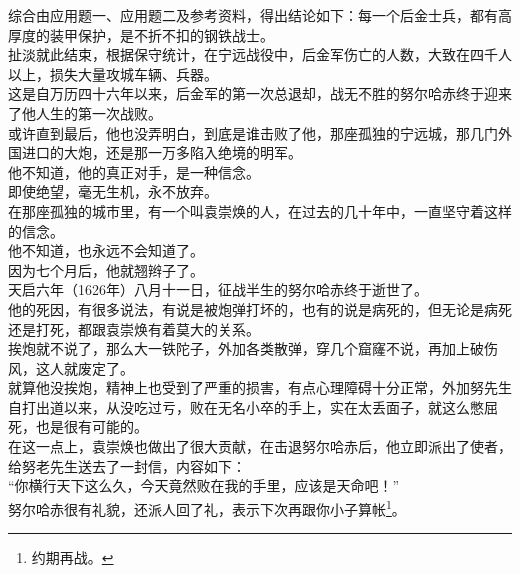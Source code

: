 \begin{multicols}{\theparacolNo}
综合由应用题一、应用题二及参考资料，得出结论如下：每一个后金士兵，都有高厚度的装甲保护，是不折不扣的钢铁战士。\\

扯淡就此结束，根据保守统计，在宁远战役中，后金军伤亡的人数，大致在四千人以上，损失大量攻城车辆、兵器。\\

这是自万历四十六年以来，后金军的第一次总退却，战无不胜的努尔哈赤终于迎来了他人生的第一次战败。\\

或许直到最后，他也没弄明白，到底是谁击败了他，那座孤独的宁远城，那几门外国进口的大炮，还是那一万多陷入绝境的明军。\\

他不知道，他的真正对手，是一种信念。\\

即使绝望，毫无生机，永不放弃。\\

在那座孤独的城市里，有一个叫袁崇焕的人，在过去的几十年中，一直坚守着这样的信念。\\

他不知道，也永远不会知道了。\\

因为七个月后，他就翘辫子了。\\

天启六年（1626年）八月十一日，征战半生的努尔哈赤终于逝世了。\\

他的死因，有很多说法，有说是被炮弹打坏的，也有的说是病死的，但无论是病死还是打死，都跟袁崇焕有着莫大的关系。\\

挨炮就不说了，那么大一铁陀子，外加各类散弹，穿几个窟窿不说，再加上破伤风，这人就废定了。\\

就算他没挨炮，精神上也受到了严重的损害，有点心理障碍十分正常，外加努先生自打出道以来，从没吃过亏，败在无名小卒的手上，实在太丢面子，就这么憋屈死，也是很有可能的。\\

在这一点上，袁崇焕也做出了很大贡献，在击退努尔哈赤后，他立即派出了使者，给努老先生送去了一封信，内容如下：\\

“你横行天下这么久，今天竟然败在我的手里，应该是天命吧！”\\

努尔哈赤很有礼貌，还派人回了礼，表示下次再跟你小子算帐\footnote{约期再战。}。\\


\end{multicols}
